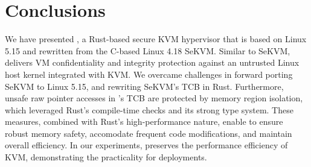 
\chapter{Conclusions}
\label{sec:conclusions}

We have presented \rustsec{}, a Rust-based secure KVM hypervisor that
is based on Linux 5.15 and rewritten from the C-based Linux 4.18 SeKVM.
Similar to SeKVM, \rustsec{} delivers VM confidentiality and integrity
protection against an untrusted Linux host kernel integrated with KVM.
We overcame challenges in forward porting SeKVM to Linux 5.15, and rewriting
SeKVM's TCB in Rust.
Furthermore, unsafe raw pointer accesses in \rustsec{}'s TCB \rustcore{}
are protected by memory region
isolation, which leveraged Rust's compile-time checks and its strong type
system.
These measures, combined with Rust's high-performance nature, enable \rustsec{}
to ensure robust memory safety, accomodate frequent code modifications, and
maintain overall efficiency.
In our experiments, \rustsec{} preserves the performance efficiency of KVM,
demonstrating the practicality for deployments.

